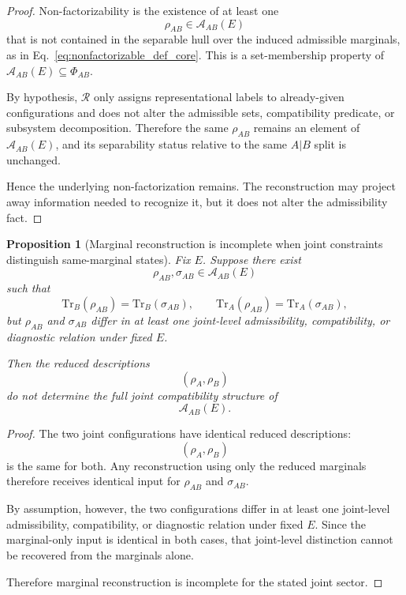 \documentclass[aps,prx,onecolumn,11pt]{revtex4-2}
\theoremstyle{plain}
\newtheorem{proposition}{Proposition}
\theoremstyle{definition}
\theoremstyle{remark}
\begin{document}
\begin{proof}
Non-factorizability is the existence of at least one
\[
\rho_{AB}\in\mathcal A_{AB}(E)
\]
that is not contained in the separable hull over the induced admissible
marginals, as in Eq.~\eqref{eq:nonfactorizable_def_core}. This is a
set-membership property of \(\mathcal A_{AB}(E)\subseteq\Phi_{AB}\).

By hypothesis, \(\mathcal R\) only assigns representational labels to
already-given configurations and does not alter the admissible sets,
compatibility predicate, or subsystem decomposition. Therefore the same
\(\rho_{AB}\) remains an element of \(\mathcal A_{AB}(E)\), and its
separability status relative to the same \(A|B\) split is unchanged.

Hence the underlying non-factorization remains. The reconstruction may
project away information needed to recognize it, but it does not alter
the admissibility fact.
\end{proof}

\begin{proposition}[Marginal reconstruction is incomplete when joint constraints distinguish same-marginal states]
\label{prop:nonfact_reconstruction_incomplete}
Fix \(E\). Suppose there exist
\[
\rho_{AB},\sigma_{AB}\in\mathcal A_{AB}(E)
\]
such that
\[
\mathrm{Tr}_B(\rho_{AB})
=
\mathrm{Tr}_B(\sigma_{AB}),
\qquad
\mathrm{Tr}_A(\rho_{AB})
=
\mathrm{Tr}_A(\sigma_{AB}),
\]
but \(\rho_{AB}\) and \(\sigma_{AB}\) differ in at least one
joint-level admissibility, compatibility, or diagnostic relation under
fixed \(E\).

Then the reduced descriptions
\[
(\rho_A,\rho_B)
\]
do not determine the full joint compatibility structure of
\[
\mathcal A_{AB}(E).
\]
\end{proposition}

\begin{proof}
The two joint configurations have identical reduced descriptions:
\[
(\rho_A,\rho_B)
\]
is the same for both. Any reconstruction using only the reduced
marginals therefore receives identical input for \(\rho_{AB}\) and
\(\sigma_{AB}\).

By assumption, however, the two configurations differ in at least one
joint-level admissibility, compatibility, or diagnostic relation under
fixed \(E\). Since the marginal-only input is identical in both cases,
that joint-level distinction cannot be recovered from the marginals
alone.

Therefore marginal reconstruction is incomplete for the stated joint
sector.
\end{proof}
\end{document}
